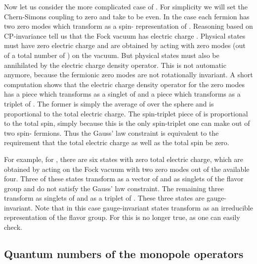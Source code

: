 \documentclass[a4paper,12pt, amsfonts, amssymb]{article}
\begin{document}
Now let us consider the more complicated case of \coordHE{}. For 
simplicity we will set the Chern-Simons coupling to zero and take \coordHE{} to
be even.
In the case \coordHE{} each fermion has two zero modes which transform as 
a spin-\coordHE{} representation of \coordHE{}. 
Reasoning based on CP-invariance
tell us that the Fock vacuum has
electric charge \coordHE{}. Physical states must
have zero electric charge and are obtained by acting with \coordHE{}
zero modes (out of a total number of \coordHE{}) on the vacuum.
But physical states must also be annihilated by the electric charge density
operator. This is not automatic anymore, because the fermionic zero modes 
are not rotationally invariant. A short computation shows that the
electric charge density operator for the zero modes \coordHE{} has a piece which transforms as a singlet of \coordHE{} and a piece which transforms 
as a triplet of \coordHE{}. The former is simply the average of 
\coordHE{} over the sphere and is proportional to the total electric charge.
The spin-triplet piece of \coordHE{} is proportional to the total spin, simply because this is the only spin-triplet one can make out of two 
spin-\coordHE{} fermions. Thus the Gauss' law constraint is equivalent to the requirement that the total electric charge as well as the total spin be zero.

For example, for
\coordHE{}, there are six states with zero total electric charge, which
are obtained by acting on the Fock vacuum with two zero modes out of the
available four. Three of these states transform as a vector of \coordHE{}
and as singlets of the flavor group \coordHE{} and do not
satisfy the Gauss' law constraint. The remaining three transform
as singlets of \coordHE{} and as a triplet of \coordHE{}.
These three states are gauge-invariant. Note that in this case gauge-invariant states transform as an irreducible representation of the flavor group.
For \coordHE{} this is no longer true, as one can easily check.

\subsection{Quantum numbers of the monopole operators}
\end{document}
